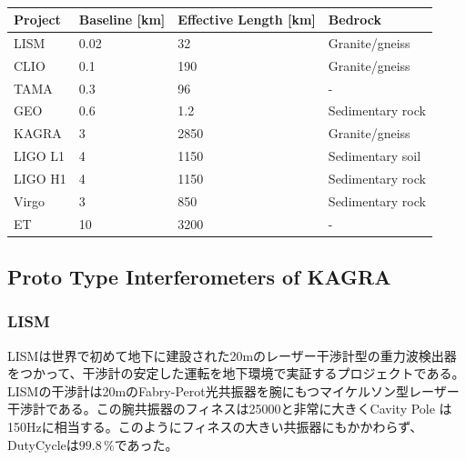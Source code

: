\begin{table}[h] 
  \begin{center}
    \caption{\cite{chen2017brief,beker2013low}}\label{tb:tb101}
    \begin{tabular}{llll} 
      \hline
      Project & Baseline [km] & Effective Length [km] & Bedrock \\ \hline \hline
      LISM  & 0.02    & 32  & Granite/gneiss \\
      CLIO  & 0.1   & 190 & Granite/gneiss \\
      TAMA  & 0.3   & 96  & - \\ 
      GEO   & 0.6   & 1.2 & Sedimentary rock \\
      KAGRA   & 3  & 2850  & Granite/gneiss \\
      LIGO L1 & 4  & 1150  & Sedimentary soil \\
      LIGO H1 & 4  & 1150  & Sedimentary rock \\
      Virgo   & 3  & 850   & Sedimentary rock \\
      ET      & 10 & 3200  & - \\
      \hline
    \end{tabular}
  \end{center}
\end{table}

\subsection{Proto Type Interferometers of KAGRA}
\subsubsection{LISM}
LISMは世界で初めて地下に建設された20mのレーザー干渉計型の重力波検出器をつかって、干渉計の安定した運転を地下環境で実証するプロジェクトである。LISMの干渉計は20mのFabry-Perot光共振器を腕にもつマイケルソン型レーザー干渉計である。この腕共振器のフィネスは25000と非常に大きくCavity Pole は150Hzに相当する。このようにフィネスの大きい共振器にもかかわらず、DutyCycleは$99.8\,\%$であった。


